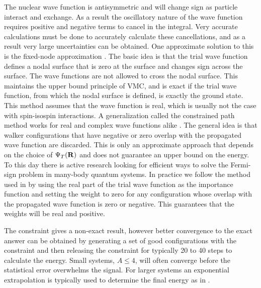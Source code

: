 The nuclear wave function is antisymmetric and will change sign as particle interact and exchange. As a result the oscillatory nature of the wave function requires positive and negative terms to cancel in the integral. Very accurate calculations must be done to accurately calculate these cancellations, and as a result very large uncertainties can be obtained. One approximate solution to this is the fixed-node approximation \cite{moskowitz1982}. The basic idea is that the trial wave function defines a nodal surface that is zero at the surface and changes sign across the surface. The wave functions are not allowed to cross the nodal surface. This maintains the upper bound principle of VMC, and is exact if the trial wave function, from which the nodal surface is defined, is exactly the ground state. This method assumes that the wave function is real, which is usually not the case with spin-isospin interactions. A generalization called the constrained path method works for real and complex wave functions alike \cite{wiringa2000}. The general idea is that walker configurations that have negative or zero overlap with the propagated wave function are discarded. This is only an approximate approach that depends on the choice of $\Psi_T(\mathbf{R})$ and does not guarantee an upper bound on the energy. To this day there is active research looking for efficient ways to solve the Fermi-sign problem in many-body quantum systems. In practice we follow the method used in \cite{zhang2003} by using the real part of the trial wave function as the importance function and setting the weight to zero for any configuration whose overlap with the propagated wave function is zero or negative. This guarantees that the weights will be real and positive.

The constraint gives a non-exact result, however better convergence to the exact answer can be obtained by generating a set of good configurations with the constraint and then releasing the constraint for typically 20 to 40 steps to calculate the energy. Small systems, $A\le4$, will often converge before the statistical error overwhelms the signal. For larger systems an exponential extrapolation is typically used to determine the final energy as in \cite{pudliner1997}.

